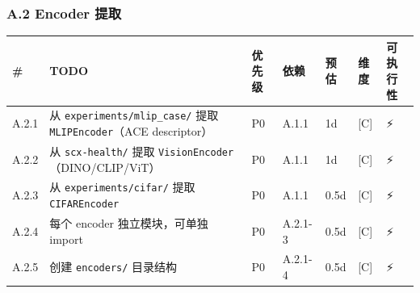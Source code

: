 \documentclass[
  12pt,
]{ctexart}
\begin{document}
\subsubsection{A.2 Encoder 提取}\label{a.2-encoder-ux63d0ux53d6}

\begin{longtable}[]{@{}
  >{\raggedright\arraybackslash}p{}
  >{\raggedright\arraybackslash}p{}
  >{\raggedright\arraybackslash}p{}
  >{\raggedright\arraybackslash}p{}
  >{\raggedright\arraybackslash}p{}
  >{\raggedright\arraybackslash}p{}
  >{\raggedright\arraybackslash}p{}@{}}
\toprule\noalign{}
\begin{minipage}[b]{\linewidth}\raggedright
\#
\end{minipage} & \begin{minipage}[b]{\linewidth}\raggedright
TODO
\end{minipage} & \begin{minipage}[b]{\linewidth}\raggedright
优先级
\end{minipage} & \begin{minipage}[b]{\linewidth}\raggedright
依赖
\end{minipage} & \begin{minipage}[b]{\linewidth}\raggedright
预估
\end{minipage} & \begin{minipage}[b]{\linewidth}\raggedright
维度
\end{minipage} & \begin{minipage}[b]{\linewidth}\raggedright
可执行性
\end{minipage} \\
\midrule\noalign{}
\endhead
\bottomrule\noalign{}
\endlastfoot
A.2.1 & 从 \texttt{experiments/mlip\_case/} 提取
\texttt{MLIPEncoder}（ACE descriptor） & P0 & A.1.1 & 1d & {[}C{]} &
⚡ \\
A.2.2 & 从 \texttt{scx-health/} 提取
\texttt{VisionEncoder}（DINO/CLIP/ViT） & P0 & A.1.1 & 1d & {[}C{]} &
⚡ \\
A.2.3 & 从 \texttt{experiments/cifar/} 提取 \texttt{CIFAREncoder} & P0 &
A.1.1 & 0.5d & {[}C{]} & ⚡ \\
A.2.4 & 每个 encoder 独立模块，可单独 import & P0 & A.2.1-3 & 0.5d &
{[}C{]} & ⚡ \\
A.2.5 & 创建 \texttt{encoders/} 目录结构 & P0 & A.2.1-4 & 0.5d & {[}C{]}
& ⚡ \\
\end{longtable}
\end{document}

